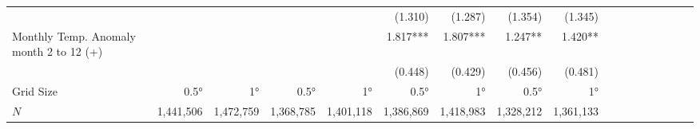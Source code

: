 \begin{table}[H]
\begin{adjustbox}{max width=\linewidth}
\begin{tabular}{lrrrrrrrrrrrrrrrr}
                                             &             &             &           &             &       (1.310) &      (1.287)  &    (1.354) &      (1.345) \\
Monthly Temp. Anomaly month 2 to 12 (+)      &             &             &           &             &      1.817*** &     1.807***  &    1.247** &      1.420** \\
                                             &             &             &           &             &       (0.448) &      (0.429)  &    (0.456) &      (0.481) \\

\midrule
Grid Size                                   &       0.5° &      1°    &         0.5° &      1°   &      0.5° &     1°    &          0.5° &      1°   \\ 
$N$                                         &    1,441,506 &   1,472,759 &   1,368,785 &   1,401,118 &  1,386,869 &    1,418,983 &     1,328,212 &    1,361,133\\ 
\bottomrule
\end{tabular}
\end{adjustbox}
\end{table}